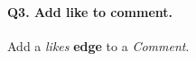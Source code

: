 \paragraph{\textbf{Q3}. Add like to comment.}
Add a \emph{likes} \textbf{edge} to a \emph{Comment}.
